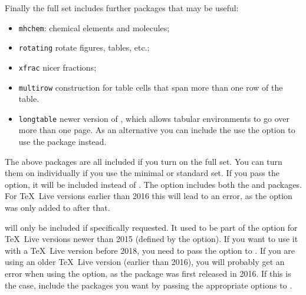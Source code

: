 Finally the full set includes further packages that may be useful:
\begin{itemize}\setlength{\parskip}{0pt}\setlength{\itemsep}{0pt}
\item \texttt{mhchem}: chemical elements and molecules;
\item \texttt{rotating} rotate figures, tables, etc.;
\item \texttt{xfrac} nicer fractions;
\item \texttt{multirow} construction for table cells that span more than one row of the table.
\item \texttt{longtable} newer version of , which allows tabular environments to go over more than one page.
  As an alternative you can include the use the option  to use the  package instead.
\end{itemize}
The above packages are all included if you turn on the full set.
You can turn them on individually if you use the minimal or standard set.
If you pass the  option, it will be included instead of .
The  option
includes both the  and  packages.
For \TeX\ Live versions earlier than 2016 this will lead to an error,
as the  option was only added to  after that.

  will only be included if specifically requested.
  It used to be part of the  option
  for \TeX\ Live versions newer than 2015 (defined by the  option).
  If you want to use it with a \TeX\ Live version before 2018,
  you need to pass the option  to .
 If you are using an older \TeX\ Live version (earlier than 2016),
  you will probably get an error when using the  option,
  as the  package was first released in 2016.
  If this is the case, include the packages you want by passing the appropriate options to .

